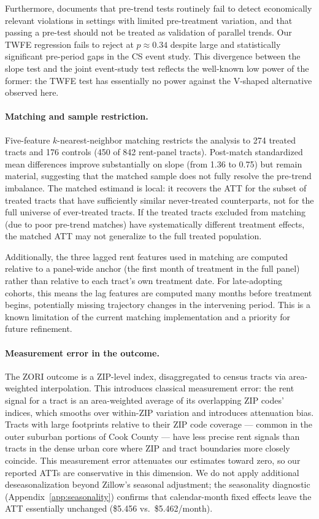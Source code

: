 Furthermore, \citet{roth2022pretest} documents that pre-trend tests routinely fail to detect economically relevant violations in settings with limited pre-treatment variation, and that passing a pre-test should not be treated as validation of parallel trends. Our TWFE regression fails to reject at $p \approx 0.34$ despite large and statistically significant pre-period gaps in the CS event study. This divergence between the slope test and the joint event-study test reflects the well-known low power of the former: the TWFE test has essentially no power against the V-shaped alternative observed here.

\paragraph{Matching and sample restriction.} Five-feature $k$-nearest-neighbor matching restricts the analysis to 274 treated tracts and 176 controls (450 of 842 rent-panel tracts). Post-match standardized mean differences improve substantially on slope (from 1.36 to 0.75) but remain material, suggesting that the matched sample does not fully resolve the pre-trend imbalance. The matched estimand is local: it recovers the ATT for the subset of treated tracts that have sufficiently similar never-treated counterparts, not for the full universe of ever-treated tracts. If the treated tracts excluded from matching (due to poor pre-trend matches) have systematically different treatment effects, the matched ATT may not generalize to the full treated population.

Additionally, the three lagged rent features used in matching are computed relative to a panel-wide anchor (the first month of treatment in the full panel) rather than relative to each tract's own treatment date. For late-adopting cohorts, this means the lag features are computed many months before treatment begins, potentially missing trajectory changes in the intervening period. This is a known limitation of the current matching implementation and a priority for future refinement.

\paragraph{Measurement error in the outcome.} The ZORI outcome is a ZIP-level index, disaggregated to census tracts via area-weighted interpolation. This introduces classical measurement error: the rent signal for a tract is an area-weighted average of its overlapping ZIP codes' indices, which smooths over within-ZIP variation and introduces attenuation bias. Tracts with large footprints relative to their ZIP code coverage --- common in the outer suburban portions of Cook County --- have less precise rent signals than tracts in the dense urban core where ZIP and tract boundaries more closely coincide. This measurement error attenuates our estimates toward zero, so our reported ATTs are conservative in this dimension. We do not apply additional deseasonalization beyond Zillow's seasonal adjustment; the seasonality diagnostic (Appendix~\ref{app:seasonality}) confirms that calendar-month fixed effects leave the ATT essentially unchanged (\$5.456 vs.\ \$5.462/month).

